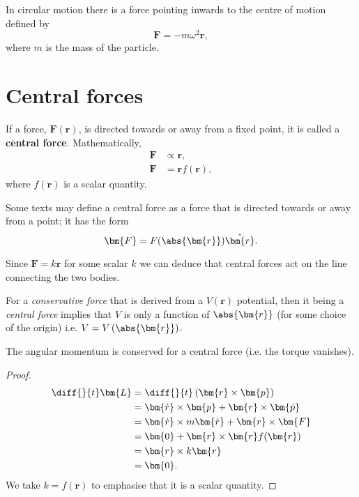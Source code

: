 \documentclass[12pt, a4paper]{article}
\begin{document}
\begin{mdthm}
    In circular motion there is a force pointing inwards to the centre of motion defined by
    \[\bm{F}=-m\omega^2 \bm{r},\]
    where \(m\) is the mass of the particle.
\end{mdthm}

\section{Central forces}

\begin{definition}
    If a force, \(\bm{F}(\bm{r})\), is directed towards or away from a fixed point, it is called a \textbf{central force}. Mathematically, 
    \[\begin{aligned}
        \bm{F} &\propto \bm{r}, \\
        \bm{F} &= \bm{r}f(\bm{r}),
    \end{aligned}\]
    where \(f(\bm{r})\) is a scalar quantity.
\end{definition}

\begin{mdremark}
    Some texts may define a central force as a force that is directed towards or away from a point; it has the form
    \[\bm{F} = F(\abs{\bm{r}})\hat{\bm{r}}.\]
\end{mdremark}

\begin{mdnote}
    Since \(\bm{F}=k\bm{r}\) for some scalar \(k\) we can deduce that central forces act on the line connecting the two bodies.
\end{mdnote}

\begin{theorem}
    For a \textit{conservative force} that is derived from a \(V(\bm{r})\) potential, then it being a \textit{central force} implies that \(V\) is only a function of \(\abs{\bm{r}}\) (for some choice of the origin) i.e. \(V=V\left(\abs{\bm{r}}\right)\).
\end{theorem}

\begin{mdthm}
    The angular momentum is conserved for a central force (i.e. the torque vanishes).
\end{mdthm}

\begin{proof}
    \[\begin{aligned}
        \diff{}{t}\bm{L} &= \diff{}{t} \left( \bm{r} \times \bm{p} \right) \\
        &= \bm{\dot{r}} \times \bm{p} +\bm{r} \times \bm{\dot{p}} \\
        &= \bm{\dot{r}} \times m\bm{\dot{r}} + \bm{r}\times \bm{F} \\
        &= \bm{0}+\bm{r}\times \bm{r}f(\bm{r}) \\
        &= \bm{r} \times k\bm{r} \\
        &= \bm{0}.
    \end{aligned}\]
    We take \(k=f(\bm{r})\) to emphasise that it is a scalar quantity.
\end{proof}
\end{document}
